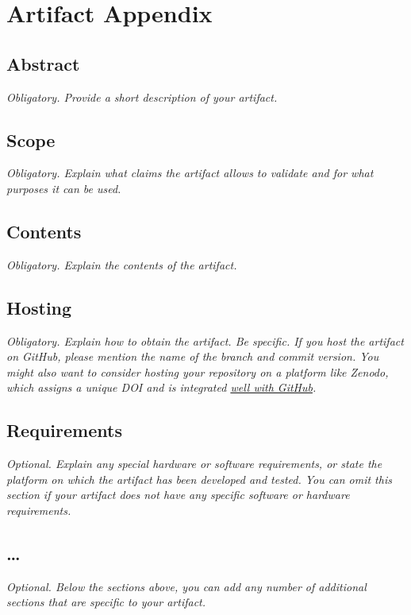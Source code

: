 \documentclass{article}
\begin{document}

\appendix
\section{Artifact Appendix}

\subsection*{Abstract}

{\em Obligatory. Provide a short description of your artifact.}

\subsection*{Scope}

{\em Obligatory. Explain what claims the artifact allows to validate and for what purposes it can be used.}

\subsection*{Contents}

{\em Obligatory. Explain the contents of the artifact.}

\subsection*{Hosting}

{\em Obligatory. Explain how to obtain the artifact. Be specific. If you host the artifact on GitHub, please mention the name of the branch and commit version. You might also want to consider hosting your repository on a platform like Zenodo, which assigns a unique DOI and is integrated \href{https://guides.github.com/activities/citable-code/}{well with GitHub}.}

\subsection*{Requirements}

{\em Optional. Explain any special hardware or software requirements, or state the platform on which the artifact has been developed and tested. You can omit this section if your artifact does not have any specific software or hardware requirements.}

\subsection*{\ldots{}}

{\em Optional. Below the sections above, you can add any number of additional sections that are specific to your artifact.}


\end{document}
